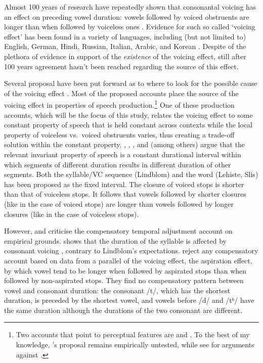 \documentclass[preprint]{JASAnew}
\begin{document}
Almost 100 years of research have repeatedly shown that consonantal
voicing has an effect on preceding vowel duration: vowels followed by
voiced obstruents are longer than when followed by voiceless ones
\citep{heffner1937, house1953, belasco1953, peterson1960, halle1967, chen1970, klatt1973, lisker1974, raphael1975, javkin1976, maddieson1976, farnetani1986, kluender1988, laeufer1992, fowler1992, hussein1994, esposito2002, lampp2004, warren2005, durvasula2012}.
Evidence for such so called `voicing effect' has been found in a variety
of languages, including (but not limited to) English, German, Hindi,
Russian, Italian, Arabic, and Korean \citep[see][ for a more
comprehensive, but still not exhaustive list]{maddieson1976}. Despite of
the plethora of evidence in support of the \emph{existence} of the
voicing effect, still after 100 years agreement hasn't been reached
regarding the source of this effect.

Several proposal have been put forward as to where to look for the
possible cause of the voicing effect \citep[see][ and
\citet{soskuthy2013} for an overview]{maddieson1976}. Most of the
proposed accounts place the source of the voicing effect in properties
of speech
production.\footnote{Two accounts that point to perceptual features are \citet{javkin1976} and \citet{kluender1988}. To the best of my knowledge, \citet{javkin1976}'s proposal remains empirically untested, while see \citet{fowler1992} for arguments against \citet{kluender1988}.}
One of these production accounts, which will be the focus of this study,
relates the voicing effect to some constant property of speech that is
held constant across contexts while the local property of voiceless
vs.~voiced obstruents varies, thus creating a trade-off solution within
the constant property. \citet{lindblom1967}, \citet{slis1969a},
\citet{slis1969}, and \citet{lehiste1970} (among others) argue that the
relevant invariant property of speech is a constant durational interval
within which segments of different duration results in different
duration of other segments. Both the syllable/VC sequence (Lindblom) and
the word (Lehiste, Slis) has been proposed as the fixed interval. The
closure of voiced stops is shorter than that of voiceless stops. It
follows that vowels followed by shorter closures (like in the case of
voiced stops) are longer than vowels followed by longer closures (like
in the case of voiceless stops).

However, \citet{chen1970} and \citet{maddieson1976} criticise the
compensatory temporal adjustment account on empirical grounds.
\citet{chen1970} shows that the duration of the syllable is affected by
consonant voicing \citep[compatible with findings in][]{jacewicz2009},
contrary to Lindblom's expectations. \citet{maddieson1976} reject any
compensatory account based on data from a parallel of the voicing
effect, the aspiration effect, by which vowel tend to be longer when
followed by aspirated stops than when followed by non-aspirated stops.
They find no compensatory pattern between vowel and consonant duration:
the consonant /t/, which has the shortest duration, is preceded by the
shortest vowel, and vowels before /d/ and /tʰ/ have the same duration
although the durations of the two consonant are different.
\end{document}

